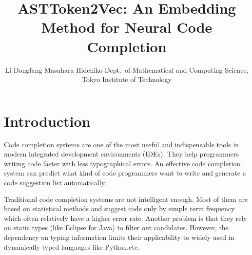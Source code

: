 \documentclass[T, E]{compsoft}
\begin{document}
\title{ASTToken2Vec: An Embedding Method for Neural Code Completion}

\author{Li Dongfang  \quad   Masuhara Hidehiko
%
%
%
%
%
{Dept.\ of Mathematical and Computing Science, Tokyo Institute of Technology}}




\maketitle \thispagestyle {empty}







\section{Introduction}
Code completion systems are one of the most useful and indispensable tools in modern integrated development environments (IDEs). They help programmers writing code faster with less typographical errors.
An effective code completion system can predict what kind of code programmers want to write and generate a code suggestion list automatically. 


Traditional code completion systems are not intelligent enough. 
Most of them are based on statistical methods and suggest code only by simple term frequency which often relatively have a higher error rate. 
Another problem is that they rely on static types (like Eclipse for Java) to filter out candidates. 
However, the dependency on typing information limits their applicability to widely used in dynamically typed languages like Python.etc.
\end{document}
